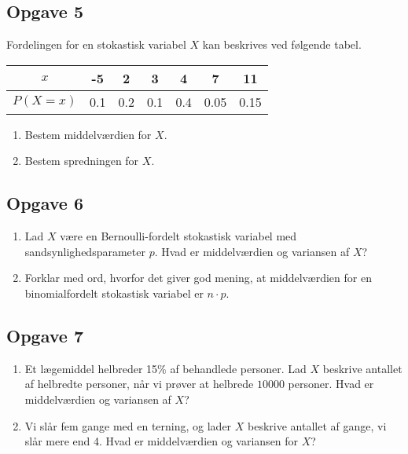 \subsection*{Opgave 5}

Fordelingen for en stokastisk variabel $X$ kan beskrives ved følgende tabel.

\begin{center}
	\begin{tabular}{c|c|c|c|c|c|c}
		$x$ & -5 & 2 & 3 & 4 & 7 & 11 \\
		\hline
		$P(X = x)$ & 0.1 & 0.2 & 0.1 & 0.4 & 0.05 & 0.15
	\end{tabular}
\end{center}

\begin{enumerate}[label=\roman*)]
	\item Bestem middelværdien for $X$.
	\item Bestem spredningen for $X$.
\end{enumerate}

\subsection*{Opgave 6}
\begin{enumerate}[label=\roman*)]
\item Lad $X$ være en Bernoulli-fordelt stokastisk variabel med sandsynlighedsparameter $p$. Hvad er middelværdien og variansen af $X$?
\item Forklar med ord, hvorfor det giver god mening, at middelværdien for en binomialfordelt stokastisk variabel er $n\cdot p$. 
\end{enumerate}

\subsection*{Opgave 7}
\begin{enumerate}[label=\roman*)]
\item Et lægemiddel helbreder 15$\%$ af behandlede personer. Lad $X$ beskrive antallet af helbredte personer, når vi prøver at helbrede $10000$ personer. Hvad er middelværdien og variansen af $X$?
\item Vi slår fem gange med en terning, og lader $X$ beskrive antallet af gange, vi slår mere end 4. Hvad er middelværdien og variansen for $X$?

\end{enumerate}